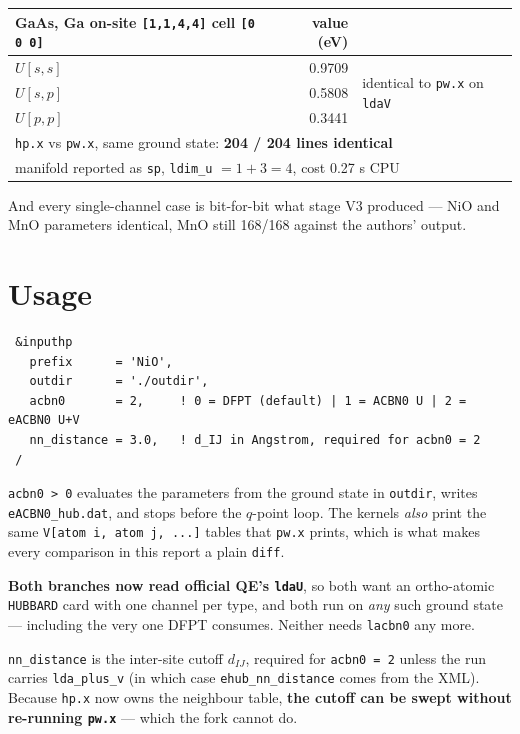 \documentclass[11pt,a4paper]{article}
\newcommand{\C}[1]{\texttt{\small #1}}
\begin{document}
\begin{center}\small
\begin{tabular}{lrl}
\toprule
GaAs, Ga on-site \C{[1,1,4,4]} cell \C{[0 0 0]} & value (eV) & \\
\midrule
$U[s,s]$ & 0.9709 & \multirow{3}{*}{identical to \C{pw.x} on \C{ldaV}} \\
$U[s,p]$ & 0.5808 & \\
$U[p,p]$ & 0.3441 & \\
\midrule
\multicolumn{3}{l}{\C{hp.x} vs \C{pw.x}, same ground state: \textbf{204 / 204 lines identical}}\\
\multicolumn{3}{l}{manifold reported as \C{sp}, \C{ldim_u} $=1+3=4$, cost 0.27 s CPU}\\
\bottomrule
\end{tabular}
\end{center}

\noindent
And every single-channel case is bit-for-bit what stage V3 produced --- NiO
and MnO parameters identical, MnO still 168/168 against the authors' output.

\section{Usage}

\begin{lstlisting}
 &inputhp
   prefix      = 'NiO',
   outdir      = './outdir',
   acbn0       = 2,     ! 0 = DFPT (default) | 1 = ACBN0 U | 2 = eACBN0 U+V
   nn_distance = 3.0,   ! d_IJ in Angstrom, required for acbn0 = 2
 /
\end{lstlisting}

\noindent
\C{acbn0 > 0} evaluates the parameters from the ground state in \C{outdir},
writes \C{eACBN0_hub.dat}, and stops before the $q$-point loop. The kernels
\emph{also} print the same \C{V[atom i, atom j, ...]} tables that \C{pw.x}
prints, which is what makes every comparison in this report a plain \C{diff}.

\smallskip
\noindent
\textbf{Both branches now read official QE's \C{ldaU}}, so both want an
ortho-atomic \C{HUBBARD} card with one channel per type, and both run on
\emph{any} such ground state --- including the very one DFPT consumes. Neither
needs \C{lacbn0} any more.

\smallskip
\noindent
\C{nn_distance} is the inter-site cutoff $d_{IJ}$, required for \C{acbn0 = 2}
unless the run carries \C{lda_plus_v} (in which case \C{ehub_nn_distance} comes
from the XML). Because \C{hp.x} now owns the neighbour table,
\textbf{the cutoff can be swept without re-running \C{pw.x}} --- which the fork
cannot do.
\end{document}
